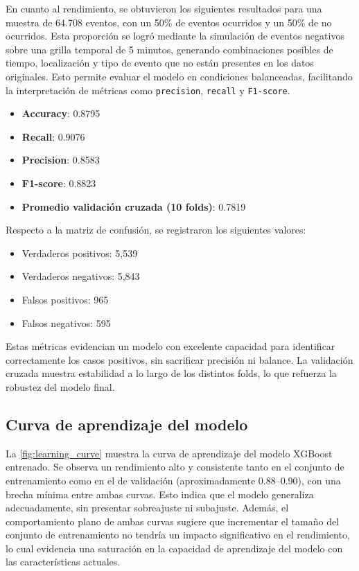 \documentclass[12pt]{article}
\begin{document}
\noindent En cuanto al rendimiento, se obtuvieron los siguientes resultados para una muestra de 64.708 eventos, con un 50\% de eventos ocurridos y un 50\% de no ocurridos. Esta proporción se logró mediante la simulación de eventos negativos sobre una grilla temporal de 5 minutos, generando combinaciones posibles de tiempo, localización y tipo de evento que no están presentes en los datos originales. Esto permite evaluar el modelo en condiciones balanceadas, facilitando la interpretación de métricas como \texttt{precision}, \texttt{recall} y \texttt{F1-score}.

\begin{itemize}
    \item \textbf{Accuracy}: 0.8795
    \item \textbf{Recall}: 0.9076
    \item \textbf{Precision}: 0.8583
    \item \textbf{F1-score}: 0.8823
    \item \textbf{Promedio validación cruzada (10 folds)}: 0.7819
\end{itemize}

\noindent Respecto a la matriz de confusión, se registraron los siguientes valores:

\begin{itemize}
    \item Verdaderos positivos: 5,539
    \item Verdaderos negativos: 5,843
    \item Falsos positivos: 965
    \item Falsos negativos: 595
\end{itemize}

Estas métricas evidencian un modelo con excelente capacidad para identificar correctamente los casos positivos, sin sacrificar precisión ni balance. La validación cruzada muestra estabilidad a lo largo de los distintos folds, lo que refuerza la robustez del modelo final.

\subsection{Curva de aprendizaje del modelo}

La \autoref{fig:learning_curve} muestra la curva de aprendizaje del modelo XGBoost entrenado. Se observa un rendimiento alto y consistente tanto en el conjunto de entrenamiento como en el de validación (aproximadamente 0.88–0.90), con una brecha mínima entre ambas curvas. Esto indica que el modelo generaliza adecuadamente, sin presentar sobreajuste ni subajuste. Además, el comportamiento plano de ambas curvas sugiere que incrementar el tamaño del conjunto de entrenamiento no tendría un impacto significativo en el rendimiento, lo cual evidencia una saturación en la capacidad de aprendizaje del modelo con las características actuales.
\end{document}
